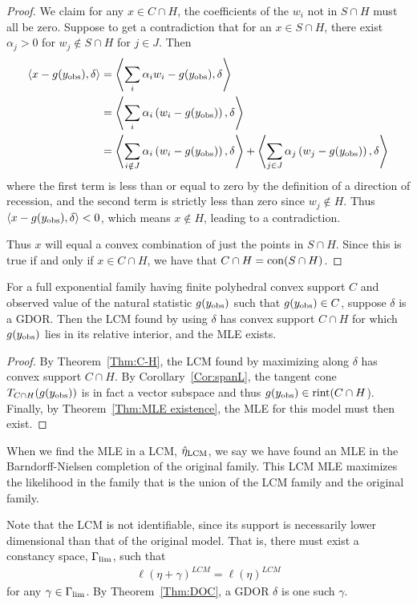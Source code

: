 \begin{proof}
We claim for any $x \in C \cap H$, the coefficients of the $w_i$ not in $S \cap H$ must all be zero.  Suppose to get a contradiction that for an $x \in S \cap H$, there exist $\alpha_j > 0$ for $w_j \notin S \cap H$ for $j \in J$.  Then 
\begin{align*}
	\langle x - g(y_{\text{obs}}), \delta  \rangle &= \left \langle  \sum_i \alpha_i w_i - g(y_{\text{obs}}), \delta \right  \rangle \\
	&= \left \langle  \sum_i \alpha_i \left( w_i - g(y_{\text{obs}}) \right), \delta \right  \rangle\\
	&=  \left \langle  \sum_{i \notin J} \alpha_i \left( w_i - g(y_{\text{obs}}) \right), \delta \right  \rangle
		+ \left \langle  \sum_{j\in J} \alpha_j \left( w_j - g(y_{\text{obs}}) \right), \delta \right  \rangle
\end{align*}
where the first term is less than or equal to zero by the definition of a direction of
recession, and the second term is strictly less than zero since $w_j \notin H$.  Thus 
$\langle x - g(y_{\text{obs}}), \delta  \rangle < 0$, which means $x \notin H$, leading to a contradiction.

Thus $x$ will equal a convex combination of just the points in $S \cap H$.  Since this is 
true if and only if $x \in C \cap H$, we have that $C \cap H = \operatorname{con}( S\cap H)$.
\end{proof}

\begin{corollary} \label{Cor:LCM MLE exists}
For a full exponential family having finite polyhedral convex support $C$ and 
observed value of the natural statistic $g(y_{\text{obs}})$ such that $g(y_{\text{obs}}) \in C$, 
suppose $\delta$ is a GDOR.  Then the LCM found by using $\delta$ has convex
support $C \cap H$ for which $g(y_{\text{obs}})$ lies in its relative interior, and the MLE exists.
\end{corollary}
\begin{proof}
By Theorem~\ref{Thm:C-H}, the LCM found by maximizing along $\delta$ has 
convex support $C \cap H$.  By Corollary~\ref{Cor:spanL},  the tangent cone 
$T_{C \cap H} (g(y_{\text{obs}}))$ is in fact a vector subspace and thus 
$g(y_{\text{obs}}) \in \operatorname{rint} (C \cap H$).  Finally, by Theorem~\ref{Thm:MLE existence}, 
the MLE for this model must then exist.
\end{proof}

When we find the MLE in a LCM, $\hat{\eta}_{\textrm{LCM}}$, we say we have found an MLE in the Barndorff-Nielsen completion of the original family.  This LCM MLE maximizes the likelihood in 
the family that is the union of the LCM family and the original family.

Note that the LCM is not identifiable, since its support is necessarily lower dimensional 
than that of the original model.  That is, there must exist a constancy space, $\Gamma_{\textrm{lim}}$, such that 
\begin{align} \label{E:Gammalim}
\ell( \eta + \gamma )^{LCM} = \ell( \eta )^{LCM}
\end{align}
for any $\gamma \in \Gamma_{\textrm{lim}}$.  By Theorem~\ref{Thm:DOC}, a GDOR $\delta$ 
is one such $\gamma$.


